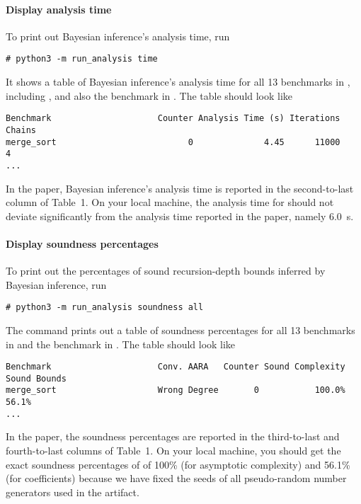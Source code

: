 \paragraph{Display analysis time}

To print out Bayesian inference's analysis time, run
\begin{verbatim}
# python3 -m run_analysis time
\end{verbatim}
%
It shows a table of Bayesian inference's analysis time for all 13 benchmarks in
, including \mergesort{}, and also the
benchmark \quicksorttiml{} in .
%
The table should look like
\begin{verbatim}
Benchmark                     Counter Analysis Time (s) Iterations Chains
merge_sort                          0              4.45      11000      4
...
\end{verbatim}

In the paper, Bayesian inference's analysis time is reported in the
second-to-last column of Table~1.
%
On your local machine, the analysis time for \mergesort{} should not deviate
significantly from the analysis time reported in the paper, namely
\qty{6.0}{\second}.

\paragraph{Display soundness percentages}

To print out the percentages of sound recursion-depth bounds inferred by
Bayesian inference, run
\begin{verbatim}
# python3 -m run_analysis soundness all
\end{verbatim}
%
The command prints out a table of soundness percentages for all 13 benchmarks in
 and the benchmark \quicksorttiml{} in
.
%
The table should look like
\begin{verbatim}
Benchmark                     Conv. AARA   Counter Sound Complexity  Sound Bounds
merge_sort                    Wrong Degree       0           100.0%         56.1%
...
\end{verbatim}

In the paper, the soundness percentages are reported in the third-to-last and
fourth-to-last columns of Table~1.
%
On your local machine, you should get the exact soundness percentages of
\mergesort{} of 100\% (for asymptotic complexity) and  56.1\% (for coefficients)
because we have fixed the seeds of all pseudo-random number generators used in
the artifact.

